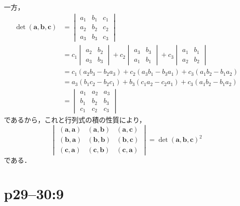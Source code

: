 \begin{tproof}
  一方，
  \begin{align*}
    \det (\bm{a},\bm{b},\bm{c}) & =
    \begin{vmatrix}
      a_1 & b_1 & c_1 \\
      a_2 & b_2 & c_2 \\
      a_3 & b_3 & c_3
    \end{vmatrix}                                                                                        \\
                                & = c_1
    \begin{vmatrix}
      a_2 & b_2 \\
      a_3 & b_3
    \end{vmatrix}
    + c_2
    \begin{vmatrix}
      a_3 & b_3 \\
      a_1 & b_1
    \end{vmatrix}
    + c_3
    \begin{vmatrix}
      a_1 & b_1 \\
      a_2 & b_2
    \end{vmatrix}
    \\
                                & = c_1 (a_2 b_3-b_2 a_3)+c_2 (a_3 b_1 - b_3 a_1)+c_3 (a_1 b_2 -b_1 a_2)   \\
                                & = a_3 (b_1 c_2 - b_2 c_1)+b_3 (c_1 a_2-c_2 a_1)+ c_3 (a_1 b_2 - b_1 a_2) \\
                                & =
    \begin{vmatrix}
      a_1 & a_2 & a_3 \\
      b_1 & b_2 & b_3 \\
      c_1 & c_2 & c_3
    \end{vmatrix}
  \end{align*}
  であるから，これと行列式の積の性質により，
  \[
    \begin{vmatrix}
      (\bm{a},\bm{a}) & (\bm{a},\bm{b}) & (\bm{a},\bm{c}) \\
      (\bm{b},\bm{a}) & (\bm{b},\bm{b}) & (\bm{b},\bm{c}) \\
      (\bm{c},\bm{a}) & (\bm{c},\bm{b}) & (\bm{c},\bm{a})
    \end{vmatrix}
    = {\det (\bm{a},\bm{b},\bm{c})}^2
  \]
  である．
\end{tproof}


\section*{p29--30:9}

